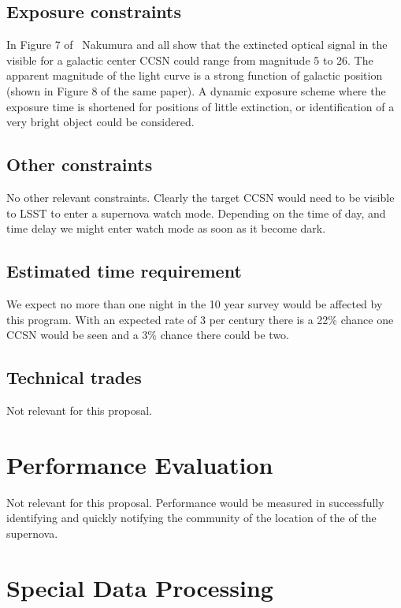 \documentclass[11pt, letterpaper]{article}
\begin{document}
\subsection{Exposure constraints}

In Figure 7 of~\cite{2016MNRAS.461.3296N} Nakumura and all show that
the extincted optical signal in the visible for a galactic center CCSN
could range from magnitude 5 to 26. The apparent magnitude of the
light curve is a strong function of galactic position (shown in Figure
8 of the same paper).  A dynamic exposure scheme where the exposure
time is shortened for positions of little extinction, or
identification of a very bright object could be considered.

\subsection{Other constraints}

No other relevant constraints.  Clearly the target CCSN would need to be
visible to LSST to enter a supernova watch mode.  Depending on the
time of day, and time delay we might enter watch mode as soon as it
become dark.

\subsection{Estimated time requirement}

We expect no more than one night in the 10 year survey would be
affected by this program. With an expected rate of 3 per century there
is a 22\% chance one CCSN would be seen and a 3\% chance there could
be two.

\subsection{Technical trades}

Not relevant for this proposal.

\section{Performance Evaluation}

Not relevant for this proposal.  Performance would be measured in successfully
identifying and quickly notifying the community of the location of the
of the supernova.

\section{Special Data Processing}
\end{document}
